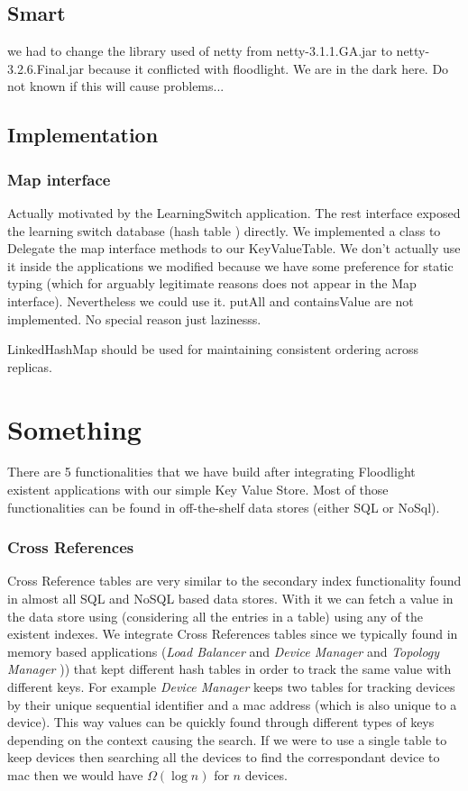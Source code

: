 \subsection{Smart}
we had to change the library used of netty from netty-3.1.1.GA.jar to
netty-3.2.6.Final.jar because it conflicted with floodlight. We are in
the dark here. Do not known if this will cause problems... 

\subsection{Implementation}

\subsubsection{Map interface} 
Actually motivated by the LearningSwitch application. The rest interface exposed the learning switch database (hash table ) directly. We implemented a class to Delegate the map interface methods to our KeyValueTable. We don't actually use it inside the applications we modified because we have some preference for static typing (which for arguably legitimate reasons does not appear in the Map interface). Nevertheless we could use it. putAll and containsValue are not implemented. No special reason just lazinesss.  

LinkedHashMap should be used for maintaining consistent ordering
across replicas. 

\section{Something}
\label{sec:heimdall:datastore:functionalities}

There are 5 functionalities that we have build after integrating
Floodlight existent applications with our simple Key Value Store. 
Most of those functionalities can be found in off-the-shelf data stores (either SQL or NoSql). 

\subsubsection{Cross References}
Cross Reference tables are very similar to the secondary index functionality found in almost all SQL and  NoSQL  based data stores. 
With it we can fetch a value in the data store using  (considering all the entries in a table) using any of the existent indexes. 
We integrate Cross References tables since we typically found in memory based applications (\emph{Load Balancer} and \emph{Device Manager} and \emph{Topology Manager} )) that kept different hash tables in order to track the same value with different keys. 
For example \emph{Device Manager}  keeps two tables for tracking devices by their  unique sequential identifier and a \gls{mac} address (which is also unique to a device). 
This way values can be quickly found through different types of keys depending on the context causing the search. 
If we were to use a single table to keep devices then searching all the devices to find the correspondant device to \gls{mac} then we would have $\Omega(\log n)$ for $n$ devices. 

